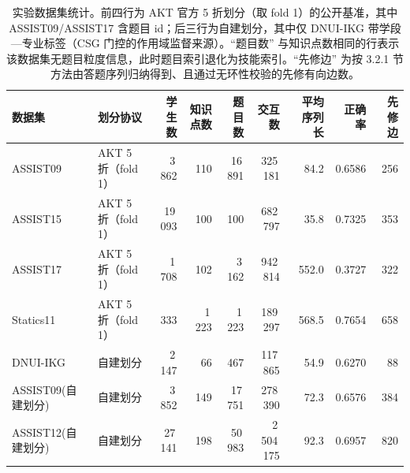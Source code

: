 \begin{table}[t]
\centering
\caption{实验数据集统计。前四行为 AKT 官方 5 折划分（取 fold 1）的公开基准，其中 ASSIST09/ASSIST17 含题目 id；后三行为自建划分，其中仅 DNUI-IKG 带学段—专业标签（CSG 门控的作用域监督来源）。``题目数'' 与知识点数相同的行表示该数据集无题目粒度信息，此时题目索引退化为技能索引。``先修边'' 为按 3.2.1 节方法由答题序列归纳得到、且通过无环性校验的先修有向边数。}
\label{tab:dataset}
\small
\begin{tabular}{llrrrrrrr}
\toprule
数据集 & 划分协议 & 学生数 & 知识点数 & 题目数 & 交互数 & 平均序列长 & 正确率 & 先修边 \\
\midrule
ASSIST09 & AKT 5 折（fold 1） & 3\,862 & 110 & 16\,891 & 325\,181 & 84.2 & 0.6586 & 256 \\
ASSIST15 & AKT 5 折（fold 1） & 19\,093 & 100 & 100 & 682\,797 & 35.8 & 0.7325 & 353 \\
ASSIST17 & AKT 5 折（fold 1） & 1\,708 & 102 & 3\,162 & 942\,814 & 552.0 & 0.3727 & 322 \\
Statics11 & AKT 5 折（fold 1） & 333 & 1\,223 & 1\,223 & 189\,297 & 568.5 & 0.7654 & 658 \\
\midrule
DNUI-IKG & 自建划分 & 2\,147 & 66 & 467 & 117\,865 & 54.9 & 0.6270 & 88 \\
ASSIST09(自建划分) & 自建划分 & 3\,852 & 149 & 17\,751 & 278\,390 & 72.3 & 0.6576 & 384 \\
ASSIST12(自建划分) & 自建划分 & 27\,141 & 198 & 50\,983 & 2\,504\,175 & 92.3 & 0.6957 & 820 \\
\bottomrule
\end{tabular}
\end{table}
